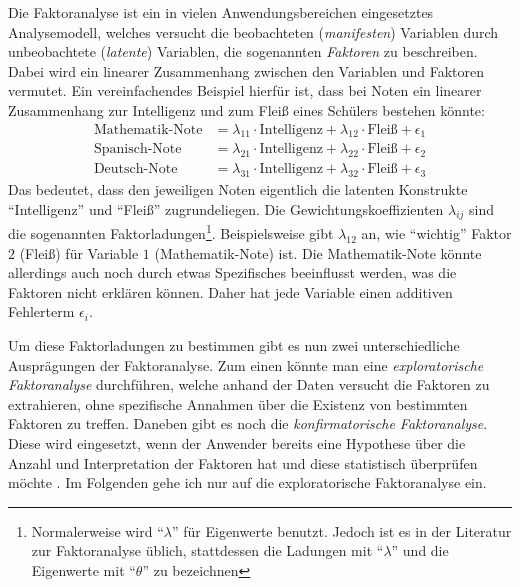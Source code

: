 \documentclass[11pt]{scrartcl}
\begin{document}
	Die Faktoranalyse ist ein in vielen Anwendungsbereichen eingesetztes
	Analysemodell, welches versucht die beobachteten (\textit{manifesten}) Variablen
	durch unbeobachtete (\textit{latente}) Variablen, die sogenannten
	\textit{Faktoren} zu beschreiben.
	Dabei wird ein linearer Zusammenhang zwischen den Variablen und Faktoren vermutet. 
	Ein vereinfachendes Beispiel hierfür ist, dass bei Noten ein linearer Zusammenhang zur Intelligenz
	und zum Fleiß eines Schülers bestehen könnte:
	\begin{equation*}
		\begin{aligned}
			\text{Mathematik-Note} &= \lambda_{11} \cdot \text{Intelligenz} + \lambda_{12} \cdot \text{Fleiß} + \epsilon_1 \\
			\text{Spanisch-Note} &=  \lambda_{21} \cdot  \text{Intelligenz} + \lambda_{22} \cdot \text{Fleiß} + \epsilon_2 \\
			\text{Deutsch-Note} &=  \lambda_{31} \cdot \text{Intelligenz} + \lambda_{32} \cdot \text{Fleiß} + \epsilon_3
		\end{aligned}
	\end{equation*}
	Das bedeutet, dass den jeweiligen Noten eigentlich die latenten Konstrukte \enquote{Intelligenz}
	und \enquote{Fleiß} zugrundeliegen. Die Gewichtungskoeffizienten $\lambda_{ij}$ sind die sogenannten
	Faktorladungen\footnote{Normalerweise wird \enquote{$\lambda$} für Eigenwerte benutzt. Jedoch ist
	es in der Literatur zur Faktoranalyse üblich, stattdessen die Ladungen mit \enquote{$\lambda$} und die Eigenwerte mit \enquote{$\theta$} zu bezeichnen}. Beispielsweise gibt $\lambda_{12}$ an, wie
	\enquote{wichtig} Faktor $2$ (Fleiß) für Variable $1$ (Mathematik-Note) ist. Die Mathematik-Note könnte allerdings auch noch durch etwas
	Spezifisches beeinflusst werden, was die Faktoren nicht erklären können. Daher hat jede Variable einen additiven Fehlerterm  $\epsilon_i$.
	
	Um diese Faktorladungen zu bestimmen gibt es nun zwei unterschiedliche Ausprägungen der Faktoranalyse.
	Zum einen könnte man eine \textit{exploratorische Faktoranalyse} durchführen,
	welche anhand der Daten versucht die Faktoren zu extrahieren, ohne spezifische Annahmen
	über die Existenz von bestimmten Faktoren zu treffen. Daneben gibt es noch die \textit{konfirmatorische 
	Faktoranalyse}. Diese wird eingesetzt, wenn der Anwender bereits eine Hypothese
	über die Anzahl und Interpretation der Faktoren hat und diese statistisch überprüfen möchte \parencite[417]{Backhaus.2021}.
	Im Folgenden gehe ich nur auf die exploratorische Faktoranalyse ein.
	
\end{document}
